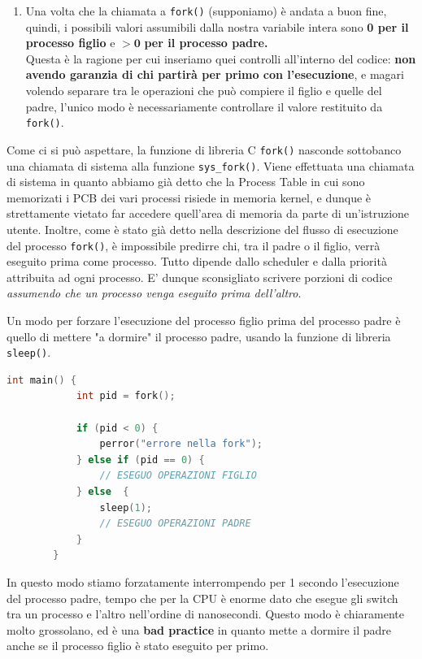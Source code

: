 \documentclass[12pt]{report}
\begin{document}
\begin{enumerate}
		\item Una volta che la chiamata a \texttt{fork()} (supponiamo) è andata a buon fine, quindi, i possibili valori assumibili dalla nostra variabile intera sono \textbf{0 per il processo figlio} e $\mathbf{>0}$ \textbf{per il processo padre.}\\
		Questa è la ragione per cui inseriamo quei controlli all'interno del codice: \textbf{non avendo garanzia di chi partirà per primo con l'esecuzione}, e magari volendo separare tra le operazioni che può compiere il figlio e quelle del padre, l'unico modo è necessariamente controllare il valore restituito da \texttt{fork()}.
	\end{enumerate}
	
	Come ci si può aspettare, la funzione di libreria C \texttt{fork()} nasconde sottobanco una chiamata di sistema alla funzione \texttt{sys\_fork()}. Viene effettuata una chiamata di sistema in quanto abbiamo già detto che la Process Table in cui sono memorizati i PCB dei vari processi risiede in memoria kernel, e dunque è strettamente vietato far accedere quell'area di memoria da parte di un'istruzione utente.
	\smallbreak
	Inoltre, come è stato già detto nella descrizione del flusso di esecuzione del processo \texttt{fork()}, è impossibile predirre chi, tra il padre o il figlio, verrà eseguito prima come processo. Tutto dipende dallo scheduler e dalla priorità attribuita ad ogni processo. E' dunque sconsigliato scrivere porzioni di codice \textit{assumendo che un processo venga eseguito prima dell'altro}.
	
	Un modo per forzare l'esecuzione del processo figlio prima del processo padre è quello di mettere "a dormire" il processo padre, usando la funzione di libreria \texttt{sleep()}.
	\begin{lstlisting}[language=C]
		int main() {
			int pid = fork();
			
			if (pid < 0) {
				perror("errore nella fork");
			} else if (pid == 0) {
				// ESEGUO OPERAZIONI FIGLIO
			} else  {
				sleep(1);
				// ESEGUO OPERAZIONI PADRE
			}
		}
	\end{lstlisting}
	In questo modo stiamo forzatamente interrompendo per 1 secondo l'esecuzione del processo padre, tempo che per la CPU è enorme dato che esegue gli switch tra un processo e l'altro nell'ordine di nanosecondi. Questo modo è chiaramente molto grossolano, ed è una \textbf{bad practice} in quanto mette a dormire il padre anche se il processo figlio è stato eseguito per primo.
	\smallbreak
	
\end{document}
